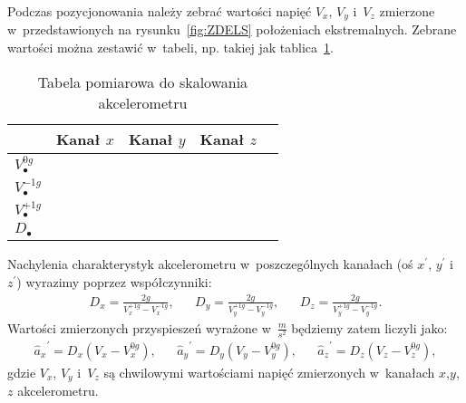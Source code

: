 \documentclass[paper=a4,DIV=12]{lpas}
\begin{document}
Podczas pozycjonowania należy zebrać wartości napięć $V_x$, $V_y$ i~$V_z$
zmierzone w~przedstawionych na rysunku~\ref{fig:ZDELS} położeniach
ekstremalnych. Zebrane wartości można zestawić w~tabeli, np. takiej jak
tablica~\ref{tab:Q31HW}.
\begin{table}[htbp]
  \centering
  \caption{Tabela pomiarowa do skalowania akcelerometru}
  \label{tab:Q31HW}
  \begin{tabular}{|l|c|c|c|c|}
    \hline
                        & Kanał $x$ & Kanał $y$ & Kanał $z$ \\ \hline
    $V_{\bullet}^{0g}$  &           &           &           \\ \hline
    $V_{\bullet}^{-1g}$ &           &           &           \\ \hline
    $V_{\bullet}^{+1g}$ &           &           &           \\ \hline
    $D_{\bullet}$       &           &           &           \\ \hline
  \end{tabular}
\end{table}

Nachylenia charakterystyk akcelerometru w~poszczególnych kanałach (oś $x^{\prime}$,
$y^{\prime}$ i~$z^{\prime}$) wyrazimy poprzez współczynniki:
\begin{align}
  & D_x = \frac{2 g}{V_x^{+1g} - V_x^{-1g}}, &
  & D_y = \frac{2 g}{V_y^{+1g} - V_y^{-1g}}, &
  & D_z = \frac{2 g}{V_y^{+1g} - V_y^{-1g}}. &
  \label{eq:TUSWM}
\end{align}
Wartości zmierzonych przyspieszeń wyrażone w~$\tfrac{m}{s^2}$ będziemy zatem
liczyli jako:
\begin{align}
  &{\hat{a}_x}^{\prime}= D_x \left(V_x - V_x^{0g}\right),&
  &{\hat{a}_y}^{\prime}= D_y \left(V_y - V_y^{0g}\right),&
  &{\hat{a}_z}^{\prime}= D_z \left(V_z - V_z^{0g}\right),&
  \label{eq:HM7PF}
\end{align}
gdzie $V_x$, $V_y$ i~$V_z$ są chwilowymi wartościami napięć zmierzonych
w~kanałach $x$,$y$,$z$ akcelerometru.
\end{document}
